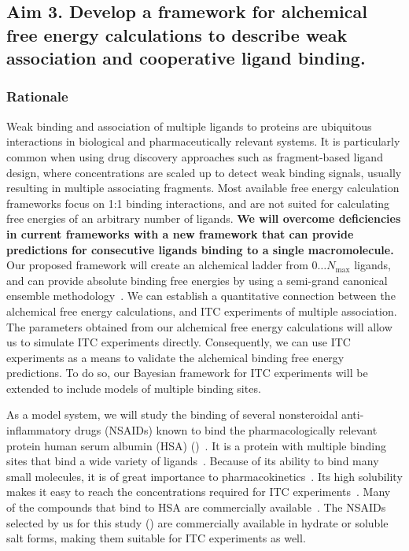\documentclass[10pt,final]{article}
\begin{document}
\subsection*{Aim 3. Develop a framework for alchemical free energy calculations to describe weak association and cooperative ligand binding.}
\subsubsection*{Rationale}
Weak binding and association of multiple ligands to proteins are ubiquitous interactions in biological and pharmaceutically relevant systems.
%
It is particularly common when using drug discovery approaches such as fragment-based ligand design, where concentrations are scaled up to detect weak binding signals, usually resulting in multiple associating fragments.
%
Most available free energy calculation frameworks focus on 1:1 binding interactions, and are not suited for calculating free energies of an arbitrary number of ligands.
%
\textbf{We will overcome deficiencies in current frameworks with a new framework that can provide predictions for consecutive ligands binding to a single macromolecule.}
%
Our proposed framework will create an alchemical ladder from 0$\dots N_\mathrm{max}$ ligands, and can provide absolute binding free energies by using a semi-grand canonical ensemble methodology~\autocite{Kofke1988a,Kofke1999a,Lynch2000a}.
%
We can establish a quantitative connection between the alchemical free energy calculations, and ITC experiments of multiple association.
%
The parameters obtained from our alchemical free energy calculations will allow us to simulate ITC experiments directly.
%
Consequently, we can use ITC experiments as a means to validate the alchemical binding free energy predictions.
%
To do so, our Bayesian framework for ITC experiments will be extended to include models of multiple binding sites.
%

As a model system, we will study the binding of several nonsteroidal anti-inflammatory drugs (NSAIDs) known to bind the pharmacologically relevant protein human serum albumin (HSA) ()~\autocite{Zsila2011a}.
%
It is a protein with multiple binding sites that bind a wide variety of ligands~\autocite{He1992a,Kragh-Hansen2002a,Sulkowska2002a}.
%
Because of its ability to bind many small molecules, it is of great importance to pharmacokinetics~\autocite{Metcalfe2010a}.
%
Its high solubility makes it easy to reach the concentrations required for ITC experiments~\autocite{Jr.1995a}. 
%
Many of the compounds that bind to HSA are commercially available~\autocite{Zsila2011a}.
%
The NSAIDs selected by us for this study () are commercially available in hydrate or soluble salt forms, making them suitable for ITC experiments as well.
\end{document}
